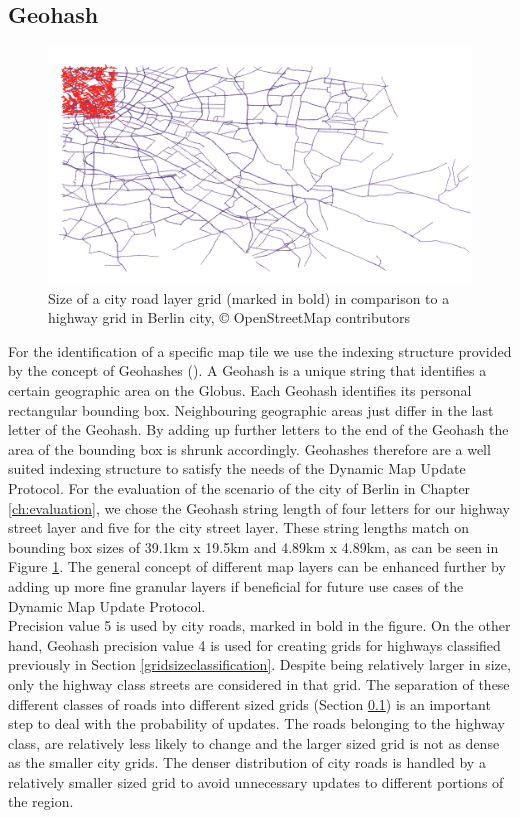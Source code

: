 \subsection{Geohash}\label{geohashsizes}
\begin{figure}
\includegraphics[scale=.65]{geohash2.png}
\caption{Size of a city road layer grid (marked in bold) in comparison to a highway grid in Berlin city, {\copyright} OpenStreetMap contributors}
\label{fg:geohash}
\end{figure}
For the identification of a specific map tile we use the indexing structure provided by the concept of Geohashes (\citet{suwardi2015geohash}). A Geohash is a unique string that identifies a certain geographic area on the Globus. Each Geohash identifies its personal rectangular bounding box. Neighbouring geographic areas just differ in the last letter of the Geohash. By adding up further letters to the end of the Geohash the area of the bounding box is shrunk accordingly. Geohashes therefore are a well suited indexing structure to satisfy the needs of the Dynamic Map Update Protocol. For the evaluation of the scenario of the city of Berlin in Chapter \ref{ch:evaluation}, we chose the Geohash string length of four letters for our highway street layer and five for the city street layer. These string lengths match on bounding box sizes of 39.1km x 19.5km and 4.89km x 4.89km, as can be seen in Figure \ref{fg:geohash}. The general concept of different map layers can be enhanced further by adding up more fine granular layers if beneficial for future use cases of the Dynamic Map Update Protocol. \\

Precision value 5 is used by city roads, marked in bold in the figure. On the other hand, Geohash precision value 4 is used for creating grids for highways classified previously in Section \ref{gridsizeclassification}. Despite being relatively larger in size, only the highway class streets are considered in that grid. The separation of these different classes of roads into different sized grids (Section \ref{geohashsizes}) is an important step to deal with the probability of updates. The roads belonging to the highway class, are relatively less likely to change and the larger sized grid is not as dense as the smaller city grids. The denser distribution of city roads is handled by a relatively smaller sized grid to avoid unnecessary updates to different portions of the region. 

